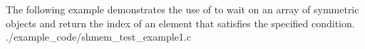 \begin{apidefinition}

\begin{apiexamples}
  \apicexample
      {The following example demonstrates the use of  to
        wait on an array of symmetric objects and return the index of an
        element that satisfies the specified condition.}
      {./example_code/shmem_test_example1.c}
      {}
\end{apiexamples}

\end{apidefinition}
